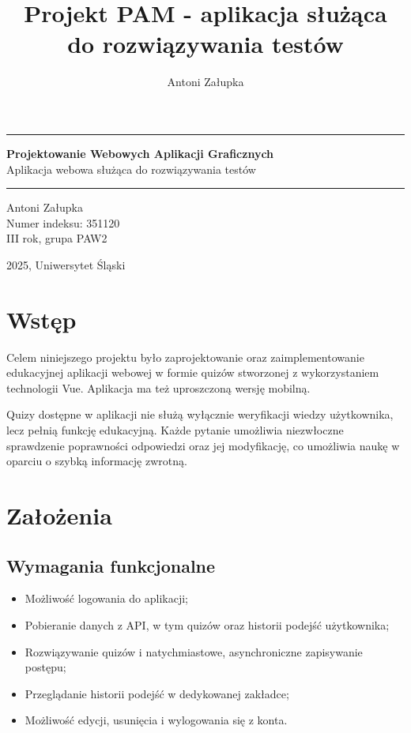 \documentclass{article}
\title{Projekt PAM - aplikacja służąca do rozwiązywania testów}
\author{Antoni Załupka}
\begin{document}
	\thispagestyle{empty}
	
	
	\vspace{4cm}
	
	\rule{\linewidth}{2mm} 
	
	\begin{center}
		\huge \textbf{Projektowanie Webowych Aplikacji Graficznych} \\
		\huge {Aplikacja webowa służąca do rozwiązywania testów} \\
	\end{center}
	
	\rule{\linewidth}{0.5mm} 
	
	\vspace{2cm}
	
	\begin{center}
		\Large{Antoni Załupka} \\
		\Large{Numer indeksu: 351120} \\
		\Large{III rok, grupa PAW2} \\
		
	\end{center}
	
	
	\vspace{15cm}
	
	\begin{center}
		\Large{2025, Uniwersytet Śląski}
	\end{center}
	
	\newpage
	
	\section{Wstęp}
	Celem niniejszego projektu było zaprojektowanie oraz zaimplementowanie edukacyjnej aplikacji webowej w formie quizów stworzonej z wykorzystaniem technologii Vue. Aplikacja ma też uproszczoną wersję mobilną. 
	
	Quizy dostępne w aplikacji nie służą wyłącznie weryfikacji wiedzy użytkownika, lecz pełnią funkcję edukacyjną. Każde pytanie umożliwia niezwłoczne sprawdzenie poprawności odpowiedzi oraz jej modyfikację, co umożliwia naukę w oparciu o szybką informację zwrotną.

    \section{Założenia}
    \subsection*{Wymagania funkcjonalne}
	\begin{itemize}
		\item Możliwość logowania do aplikacji;
		\item Pobieranie danych z API, w tym quizów oraz historii podejść użytkownika;
		\item Rozwiązywanie quizów i natychmiastowe, asynchroniczne zapisywanie postępu;
		\item Przeglądanie historii podejść w dedykowanej zakładce;
		\item Możliwość edycji, usunięcia i wylogowania się z konta.
	\end{itemize}
	
\end{document}
